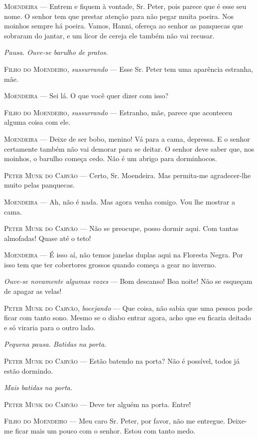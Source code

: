 \textsc{Moendeira} --- Entrem e fiquem à vontade, Sr. Peter, pois parece que é
esse seu nome. O senhor tem que prestar atenção para não pegar muita
poeira. Nos moinhos sempre há poeira. Vamos, Hanni, ofereça ao senhor as
panquecas que sobraram do jantar, e um licor de cereja ele também não
vai recusar.

\emph{Pausa. Ouve-se barulho de pratos.}

\textsc{Filho do Moendeiro}, \emph{sussurrando} --- Esse Sr. Peter tem uma
aparência estranha, mãe.

\textsc{Moendeira} --- Sei lá. O que você quer dizer com isso?

\textsc{Filho do Moendeiro}, \emph{sussurrando} --- Estranho, mãe, parece que
aconteceu alguma coisa com ele.

\textsc{Moendeira} --- Deixe de ser bobo, menino! Vá para a cama, depressa. E o
senhor certamente também não vai demorar para se deitar. O senhor deve
saber que, nos moinhos, o barulho começa cedo. Não é um abrigo para
dorminhocos.

\textsc{Peter Munk do Carvão} --- Certo, Sr. Moendeira. Mas permita-me
agradecer-lhe muito pelas panquecas.

\textsc{Moendeira} --- Ah, não é nada. Mas agora venha comigo. Vou lhe mostrar a
cama.

\textsc{Peter Munk do Carvão} --- Não se preocupe, posso dormir aqui. Com tantas
almofadas! Quase até o teto!

\textsc{Moendeira} --- É isso aí, não temos janelas duplas aqui na Floresta Negra.
Por isso tem que ter cobertores grossos quando começa a gear no inverno.

\emph{Ouve-se novamente algumas vozes} --- Bom descanso! Boa noite! Não
se esqueçam de apagar as velas!

\textsc{Peter Munk do Carvão}, \emph{bocejando} --- Que coisa, não sabia que uma
pessoa pode ficar com tanto sono. Mesmo se o diabo entrar agora, acho
que eu ficaria deitado e só viraria para o outro lado.

\emph{Pequena pausa. Batidas na porta.}

\textsc{Peter Munk do Carvão} --- Estão batendo na porta? Não é possível, todos já
estão dormindo.

\emph{Mais batidas na porta.}

\textsc{Peter Munk do Carvão} --- Deve ter alguém na porta. Entre!

\textsc{Filho do Moendeiro} --- Meu caro Sr. Peter, por favor, não me entregue.
Deixe-me ficar mais um pouco com o senhor. Estou com tanto medo.

